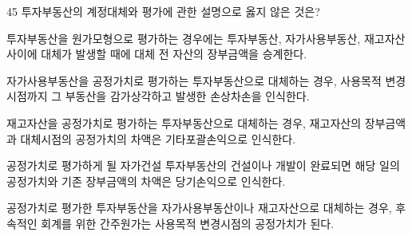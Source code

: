 \begin{question}{45}
투자부동산의 계정대체와 평가에 관한 설명으로 옳지 않은 것은?
\begin{choices}
  \item 투자부동산을 원가모형으로 평가하는 경우에는 투자부동산, 자가사용부동산, 재고자산 사이에 대체가 발생할 때에 대체 전 자산의 장부금액을 승계한다.
  \item 자가사용부동산을 공정가치로 평가하는 투자부동산으로 대체하는 경우, 사용목적 변경시점까지 그 부동산을 감가상각하고 발생한 손상차손을 인식한다.
  \item 재고자산을 공정가치로 평가하는 투자부동산으로 대체하는 경우, 재고자산의 장부금액과 대체시점의 공정가치의 차액은 기타포괄손익으로 인식한다.
  \item 공정가치로 평가하게 될 자가건설 투자부동산의 건설이나 개발이 완료되면 해당 일의 공정가치와 기존 장부금액의 차액은 당기손익으로 인식한다.
  \item 공정가치로 평가한 투자부동산을 자가사용부동산이나 재고자산으로 대체하는 경우, 후속적인 회계를 위한 간주원가는 사용목적 변경시점의 공정가치가 된다.
\end{choices}
\end{question}

